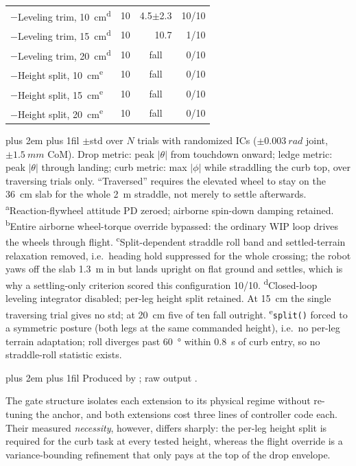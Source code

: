 \documentclass[conference]{IEEEtran}
\newcommand{\tabnote}{\par\leftskip=0pt\rightskip=0pt plus 2em%
  \parfillskip=0pt plus 1fil\relax}
\begin{document}
\begin{table}[t]
\begin{tabular}{@{}>{\raggedright\arraybackslash}p{3.5cm}rrr@{}}
\addlinespace[1pt]
$-$Leveling trim, \SI{10}{cm}\textsuperscript{d} & 10 & 4.5$\pm$2.3 & 10/10 \\
$-$Leveling trim, \SI{15}{cm}\textsuperscript{d} & 10 & 10.7 & 1/10 \\
$-$Leveling trim, \SI{20}{cm}\textsuperscript{d} & 10 & \multicolumn{1}{c}{fall} & 0/10 \\
\addlinespace[1pt]
$-$Height split, \SI{10}{cm}\textsuperscript{e} & 10 & \multicolumn{1}{c}{fall} & 0/10 \\
$-$Height split, \SI{15}{cm}\textsuperscript{e} & 10 & \multicolumn{1}{c}{fall} & 0/10 \\
$-$Height split, \SI{20}{cm}\textsuperscript{e} & 10 & \multicolumn{1}{c}{fall} & 0/10 \\
\bottomrule
\end{tabular}
\vspace{2pt}\tabnote\noindent
$\pm$std over $N$ trials with randomized ICs ($\pm\SI{0.003}{rad}$ joint,
$\pm\SI{1.5}{mm}$ CoM). Drop metric: peak $|\theta|$ from touchdown onward;
ledge metric: peak $|\theta|$ through landing; curb metric: max $|\phi|$ while
straddling the curb top, over traversing trials only. ``Traversed'' requires the
elevated wheel to stay on the \SI{36}{cm} slab for the whole \SI{2}{m} straddle,
not merely to settle afterwards.
\textsuperscript{a}Reaction-flywheel attitude PD zeroed; airborne spin-down damping retained.
\textsuperscript{b}Entire airborne wheel-torque override bypassed: the ordinary WIP loop drives the wheels through flight.
\textsuperscript{c}Split-dependent straddle roll band and settled-terrain relaxation removed, i.e.\ heading hold suppressed for the whole crossing; the robot yaws off the slab \SI{1.3}{m} in but lands upright on flat ground and settles, which is why a settling-only criterion scored this configuration 10/10.
\textsuperscript{d}Closed-loop leveling integrator disabled; per-leg height split retained. At \SI{15}{cm} the single traversing trial gives no std; at \SI{20}{cm} five of ten fall outright.
\textsuperscript{e}\texttt{split()} forced to a symmetric posture (both legs at the same commanded height), i.e.\ no per-leg terrain adaptation; roll diverges past \SI{60}{\degree} within \SI{0.8}{s} of curb entry, so no straddle-roll statistic exists.
\tabnote\noindent
Produced by ; raw output
.
\end{table}

The gate structure isolates each extension to its physical regime without
re-tuning the anchor, and both extensions cost three lines of controller code
each. Their measured \emph{necessity}, however, differs sharply: the per-leg
height split is required for the curb task at every tested height, whereas the
flight override is a variance-bounding refinement that only pays at the top of
the drop envelope.
\end{document}
